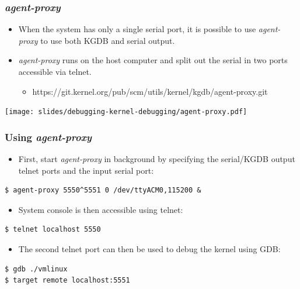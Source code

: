 \begin{frame}
  \frametitle{{\em agent-proxy}}
  \begin{itemize}
    \item When the system has only a single serial port, it is possible to use
          {\em agent-proxy} to use both KGDB and serial output.
    \item {\em agent-proxy} runs on the host computer and split out the serial
          in two ports accessible via telnet.
    \begin{itemize}
      \item https://git.kernel.org/pub/scm/utils/kernel/kgdb/agent-proxy.git
    \end{itemize}
  \end{itemize}
  \center\texttt{[image: slides/debugging-kernel-debugging/agent-proxy.pdf]}
\end{frame}

\begin{frame}[fragile]
  \frametitle{Using {\em agent-proxy}}
  \begin{itemize}
    \item First, start {\em agent-proxy} in background by specifying the
          serial/KGDB output telnet ports and the input serial port:
  \end{itemize}
  \begin{block}{}
    \begin{verbatim}
$ agent-proxy 5550^5551 0 /dev/ttyACM0,115200 &
    \end{verbatim}
  \end{block}
  \begin{itemize}
    \item System console is then accessible using telnet:
  \end{itemize}
  \begin{block}{}
    \begin{verbatim}
$ telnet localhost 5550
    \end{verbatim}
  \end{block}
  \begin{itemize}
    \item The second telnet port can then be used to debug the kernel using GDB:
  \end{itemize}
  \begin{block}{}
    \begin{verbatim}
$ gdb ./vmlinux
$ target remote localhost:5551
    \end{verbatim}
  \end{block}
\end{frame}

